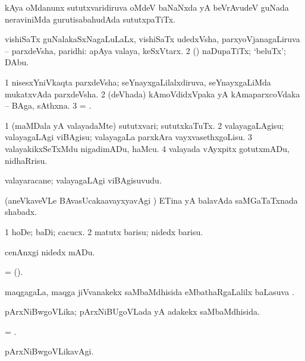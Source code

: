  kAya oMdanunx sututxvaridiruva oMdeV baNaNxda yA beVrAvudeV guNada neraviniMda gurutisabahudAda sututxpaTiTx. 

 vishiSaTx guNalakaSxNagaLuLaLx, vishiSaTx udedxVsha, parxyoVjanagaLiruva -- parxdeVsha, paridhi:  apAya valaya, keSxVtarx. 
\eanum
\numie
\num{2} (\pArxparx) naDupaTiTx; `beluTx'; DAbu.
\enum
\emng 

\noindent
\gl{\pagu} 
\bmng
\bnum
\num{1}  nisesxYniVkaqta parxdeVsha; seYnayxgaLilalxdiruva, seYnayxgaLiMda mukatxvAda parxdeVsha. 
\num{2}  (deVhada) kAmoVdidxVpaka yA kAmaparxcoVdaka -- BAga, sAthxna.   
\num{3}   =  .
\enum
\emng
\eentry

\bentry
{} 
\gl{\sakirx} 
\bmng
\bnum
\num{1} (maMDala yA valayadaMte) sututxvari; sututxkaTuTx. 
\num{2} valayagaLAgisu; valayagaLAgi viBAgisu; valayagaLa parxkAra vayxvasethxgoLisu.  
\num{3} valayakikxSeTxMdu nigadimADu, haMcu. 
\num{4} valayada vAyxpitx gotutxmADu, nidhaRrisu.
\enum
\emng
\eentry

\bentry
{} 
\gl{\nA} 
\bmng
valayaracane; valayagaLAgi viBAgisuvudu.
\emng
\eentry

\bentry
{} 
\gl{\nA} 
\bmng
(aneVkaveVLe BAvasUcaka{a}vayxyavAgi \parx) ETina yA balavAda saMGaTaTxnada shabadx.
\emng
\eentry

\bentry
{} 
\gl{\sakirx} 
\bmng
\bnum
\num{1} hoDe; baDi; cacucx. 
\num{2} matutx barisu; nidedx barisu.
\enum
\emng

\noindent         
\gl{\akirx} 
\bmng
cenAnxgi nidedx mADu.
\emng
\eentry

\bentry
{} 
\gl{\nA} 
\bmng
=  (\saMkiSx).
\emng
\eentry

\bentry
{} 
\gl{\sapUpa} 
\bmng
maqgagaLa, maqga jiVvanakekx saMbaMdhisida eMbathaRgaLalilx baLasuva \sapUpa.
\emng
\eentry

\bentry
{} 
\gl{\gu} 
\bmng
pArxNiBwgoVLika; pArxNiBUgoVLada yA adakekx saMbaMdhisida.
\emng
\eentry

\bentry
{} 
\gl{\gu} 
\bmng
= .
\emng
\eentry

\bentry
{} 
\gl{\kirxvi} 
\bmng
pArxNiBwgoVLikavAgi.
\emng
\eentry

